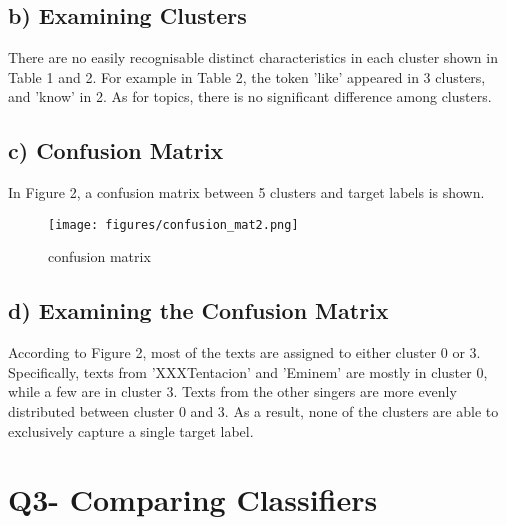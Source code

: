 \documentclass[a4paper,11pt]{article}
\begin{document}
\subsection{b) Examining Clusters}
There are no easily recognisable distinct characteristics in each cluster shown in Table 1 and 2.
For example in Table 2, the token 'like' appeared in 3 clusters, and 'know' in 2.
As for topics, there is no significant difference among clusters.
\subsection{c) Confusion Matrix}
In Figure 2, a confusion matrix between 5 clusters and target labels is shown.

\begin{figure}[htbp]
  \begin{center}
  \texttt{[image: figures/confusion\_mat2.png]}
  \caption{confusion matrix}
  \end{center}
\end{figure}
\subsection{d) Examining the Confusion Matrix}

According to Figure 2, most of the texts are assigned to either cluster 0 or 3.
Specifically, texts from 'XXXTentacion' and 'Eminem' are mostly in cluster 0, while a few are in cluster 3.
Texts from the other singers are more evenly distributed between cluster 0 and 3.
As a result, none of the clusters are able to exclusively capture a single target label.



\section{Q3- Comparing Classifiers}
\end{document}
